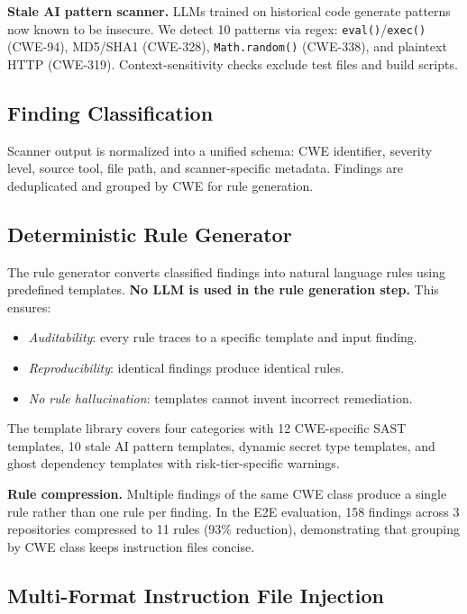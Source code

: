 \documentclass[conference,10pt]{IEEEtran}
\begin{document}
\textbf{Stale AI pattern scanner.} LLMs trained on historical code generate patterns now known to be insecure. We detect 10 patterns via regex: \texttt{eval()}/\texttt{exec()} (CWE-94), MD5/SHA1 (CWE-328), \texttt{Math.random()} (CWE-338), and plaintext HTTP (CWE-319). Context-sensitivity checks exclude test files and build scripts.

\subsection{Finding Classification}

Scanner output is normalized into a unified schema: CWE identifier, severity level, source tool, file path, and scanner-specific metadata. Findings are deduplicated and grouped by CWE for rule generation.

\subsection{Deterministic Rule Generator}

The rule generator converts classified findings into natural language rules using predefined templates. \textbf{No LLM is used in the rule generation step.} This ensures:

\begin{itemize}
    \item \textit{Auditability}: every rule traces to a specific template and input finding.
    \item \textit{Reproducibility}: identical findings produce identical rules.
    \item \textit{No rule hallucination}: templates cannot invent incorrect remediation.
\end{itemize}

The template library covers four categories with 12 CWE-specific SAST templates, 10 stale AI pattern templates, dynamic secret type templates, and ghost dependency templates with risk-tier-specific warnings.

\textbf{Rule compression.} Multiple findings of the same CWE class produce a single rule rather than one rule per finding. In the E2E evaluation, 158 findings across 3 repositories compressed to 11 rules (93\% reduction), demonstrating that grouping by CWE class keeps instruction files concise.

\subsection{Multi-Format Instruction File Injection}
\end{document}
